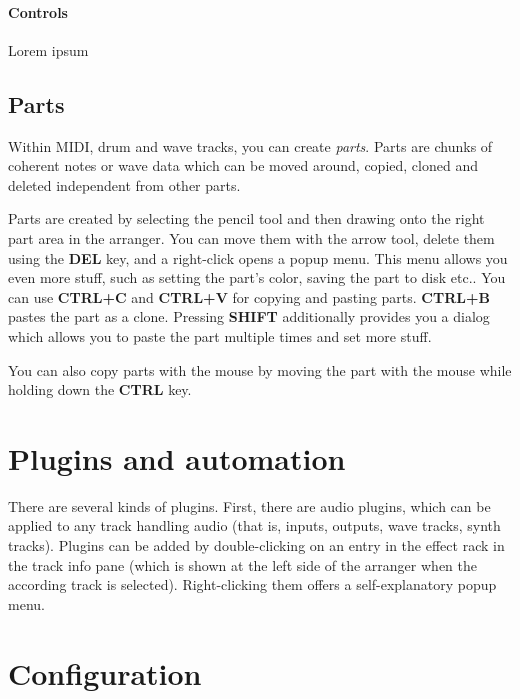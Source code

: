 \documentclass[a4paper]{report}
\newcommand{\key}[1]{\textbf{#1}}
\begin{document}
\paragraph{Controls}
Lorem ipsum %


\subsection{Parts}
Within MIDI, drum and wave tracks, you can create \emph{parts}. Parts
are chunks of coherent notes or wave data which can be moved around,
copied, cloned and deleted independent from other parts.

Parts are created by selecting the pencil tool and then drawing onto
the right part area in the arranger. You can move them with the arrow
tool, delete them using the \key{DEL} key, and a right-click opens
a popup menu. This menu allows you even more stuff, such as setting
the part's color, saving the part to disk etc.. You can use
\key{CTRL+C} and \key{CTRL+V} for copying and pasting parts.
\key{CTRL+B} pastes the part as a clone. Pressing \key{SHIFT}
additionally provides you a dialog which allows you to paste the part
multiple times and set more stuff.

You can also copy parts with the mouse by moving the part with the mouse
while holding down the \key{CTRL} key.



\section{Plugins and automation} \label{plugins}
There are several kinds of plugins. First, there are audio plugins, which
can be applied to any track handling audio (that is, inputs, outputs,
wave tracks, synth tracks). Plugins can be added by double-clicking
on an entry in the effect rack in the track info pane (which is shown
at the left side of the arranger when the according track is selected).
Right-clicking them offers a self-explanatory popup menu.

\section{Configuration}
\end{document}
